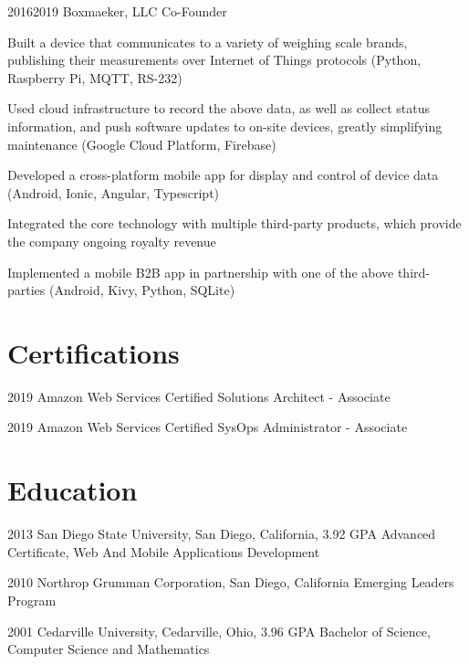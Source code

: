 \documentclass{article}
\begin{document}
\job
  {2016}{2019}
  {Boxmaeker, LLC}
  {Co-Founder}
  {\begin{achievements}
    \item Built a device that communicates to a variety of weighing scale brands, publishing their measurements over Internet of Things protocols (Python, Raspberry Pi, MQTT, RS-232)
    \item Used cloud infrastructure to record the above data, as well as collect status information, and push software updates to on-site devices, greatly simplifying maintenance (Google Cloud Platform, Firebase)
    \item Developed a cross-platform mobile app for display and control of device data (Android, Ionic, Angular, Typescript)
    \item Integrated the core technology with multiple third-party products, which provide the company ongoing royalty revenue
    \item Implemented a mobile B2B app in partnership with one of the above third-parties (Android, Kivy, Python, SQLite)
  \end{achievements}}


\section{Certifications}

\education
  {2019}
  {Amazon Web Services}
  {Certified Solutions Architect - Associate}

\education
  {2019}
  {Amazon Web Services}
  {Certified SysOps Administrator - Associate}


\section{Education}

\education
  {2013}
  {San Diego State University, San Diego, California, 3.92 GPA}
  {Advanced Certificate, Web And Mobile Applications Development}

\education
  {2010}
  {Northrop Grumman Corporation, San Diego, California}
  {Emerging Leaders Program}

\education
  {2001}
  {Cedarville University, Cedarville, Ohio, 3.96 GPA}
  {Bachelor of Science, Computer Science and Mathematics}


\section{}

\credits
\end{document}

